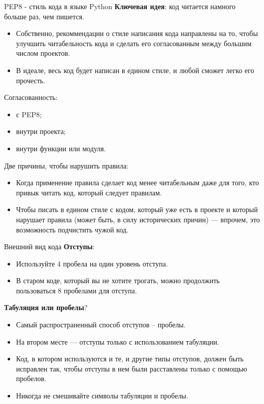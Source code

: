\documentclass[xcolor=table]{beamer}
\begin{document}
\begin{frame}{PEP8 - стиль кода в языке Python}
	\textbf{Ключевая идея}: код читается намного больше раз, чем пишется. 
	\begin{itemize}
		\item Собственно, рекоммендации о стиле написания кода направлены на то, чтобы улучшить читабельность кода и сделать его согласованным между большим числом проектов. 
		\item В идеале, весь код будет написан в едином стиле, и любой сможет легко его прочесть. 
	\end{itemize}	
	Согласованность:
	\begin{itemize}
		\item с PEP8;
		\item внутри проекта;
		\item внутри функции или модуля.				
	\end{itemize}		
	Две причины, чтобы нарушить правила:
	\begin{itemize}
		\item Когда применение правила сделает код менее читабельным даже для того, кто привык читать код, который следует правилам.
		\item Чтобы писать в едином стиле с кодом, который уже есть в проекте и который нарушает правила (может быть, в силу исторических причин) — впрочем, это возможность подчистить чужой код.	
	\end{itemize}
\end{frame}

\begin{frame}{Внешний вид кода}
	\textbf{Отступы}: 
	\begin{itemize}
		\item Используйте 4 пробела на один уровень отступа. 
		\item В старом коде, который вы не хотите трогать, можно продолжить пользоваться 8 пробелами для отступа.
	\end{itemize}	
	\textbf{Табуляция или пробелы}?
	\begin{itemize}
		\item Самый распространенный способ отступов -- пробелы. 
		\item На втором месте — отступы только с использованием табуляции. 
		\item Код, в котором используются и те, и другие типы отступов, должен быть исправлен так, чтобы отступы в нем были расставлены только с помощью пробелов.
		\item Никогда не смешивайте символы табуляции и пробелы.		
	\end{itemize}		
\end{frame}
\end{document}
